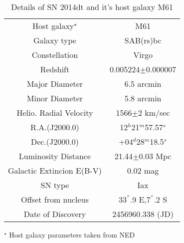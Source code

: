 \begin{table*}
\caption{ Details of SN 2014dt and it's host galaxy M61 }
\centering
\smallskip
\begin{tabular}{c c }
\hline \hline
Host galaxy$^\star$ & M61    \\
Galaxy type & SAB(rs)bc \\  
Constellation & Virgo  \\ 
Redshift & 0.005224$\pm$0.000007 \\ 
Major Diameter & 6.5 arcmin \\
Minor Diameter & 5.8 arcmin \\
Helio. Radial Velocity &  1566$\pm$2 km/sec \\
\hline
R.A.(J2000.0) & 12$^h$21$^m$57.57$^s$ \\
Dec.(J2000.0) & +04$^d$28$^m$18.5$^s$ \\
Luminosity Distance  & 21.44$\pm$0.03 Mpc \\
Galactic Extincion E(B-V) & 0.02 mag \\
SN type & Iax\\
Offset from nucleus & 33$^{''}$.9 E,7$^{''}$.2 S \\
Date of Discovery & 2456960.338 (JD) \\
\hline 
\end{tabular}
\newline
$^\star$ Host galaxy parameters taken from NED                     
\label{tab:sn14dt_m61_detail}      
\end{table*}
